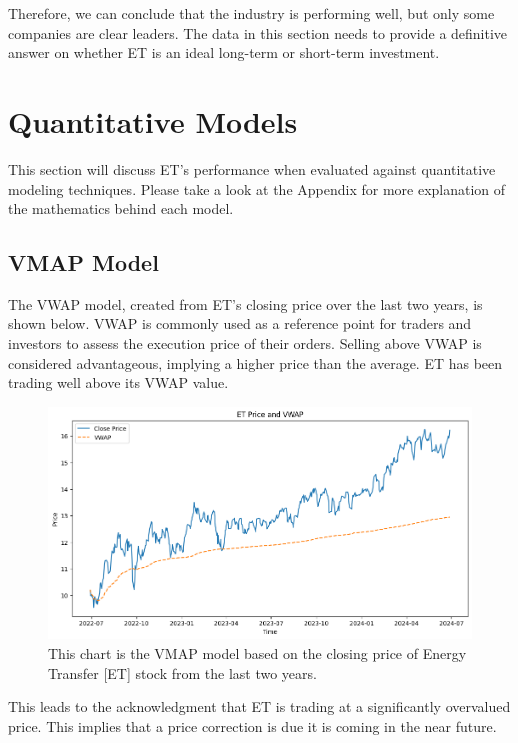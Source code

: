 \documentclass[9pt,a4paper,twoside]{tau}
\begin{document}
        Therefore, we can conclude that the industry is performing well, but only some companies are clear leaders. The data in this section needs to provide a definitive answer on whether ET is an ideal long-term or short-term investment. 
        


\section{Quantitative Models}

    This section will discuss ET's performance when evaluated against quantitative modeling techniques. Please take a look at the Appendix for more explanation of the mathematics behind each model.

    \subsection{VMAP Model}
    
        The VWAP model, created from ET's closing price over the last two years, is shown below. VWAP is commonly used as a reference point for traders and investors to assess the execution price of their orders. Selling above VWAP is considered advantageous, implying a higher price than the average. ET has been trading well above its VWAP value.

        \begin{figure}[H]
            \centering
            \includegraphics[width=0.85\columnwidth]{Figures/ETPriceAndVWAP.png}
            \caption{This chart is the VMAP model based on the closing price of Energy Transfer [ET] stock from the last two years\cite{yahoo-finance-2024}.}
            \label{fig:figure}
        \end{figure}

        This leads to the acknowledgment that ET is trading at a significantly overvalued price. This implies that a price correction is due it is coming in the near future. 
\end{document}
